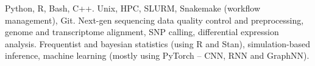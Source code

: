 {}
{Python, R, Bash, C++.}{}
{}
{Unix, HPC, SLURM, Snakemake (workflow management), Git.}{}
{}
{Next-gen sequencing data quality control and preprocessing, genome and transcriptome alignment, SNP calling, differential expression analysis.}{}
{}
{Frequentist and bayesian statistics (using R and Stan), simulation-based inference, machine learning (mostly using PyTorch -- CNN, RNN and GraphNN).}{}
